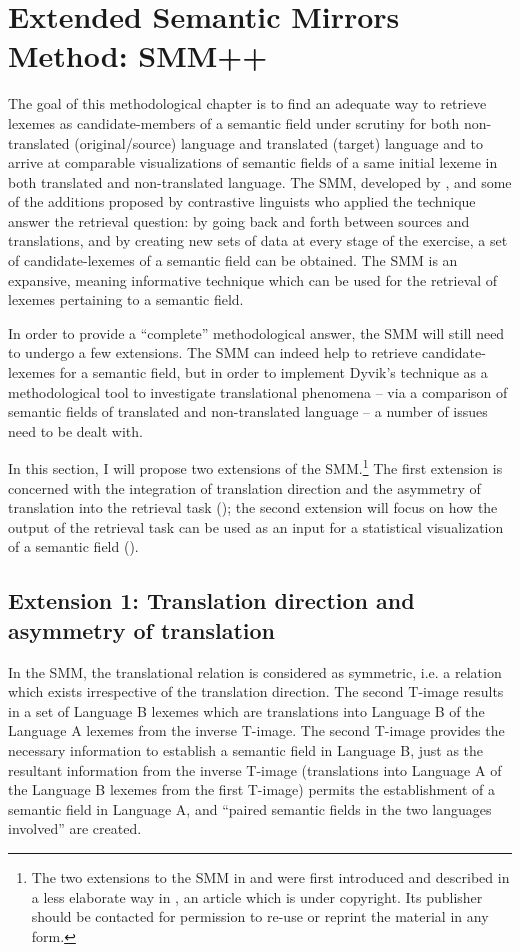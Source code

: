 \section{Extended Semantic Mirrors Method: SMM++}
\label{sec:3.5}
The goal of this methodological chapter is to find an adequate way to retrieve lexemes as candidate-members of a semantic field under scrutiny for both non-translated (original\slash source) language and translated (target) language and to arrive at comparable visualizations of semantic fields of a same initial lexeme in both translated and non-translated language. The SMM, developed by \citet{johansson_translational_1998,langemets_translations_2005}, and some of the additions proposed by contrastive linguists who applied the technique answer the retrieval question: by going back and forth between sources and translations, and by creating new sets of data at every stage of the exercise, a set of candidate-lexemes of a semantic field can be obtained. The SMM is an expansive, meaning informative technique which can be used for the retrieval of lexemes pertaining to a semantic field.

In order to provide a ``complete'' methodological answer, the SMM will still need to undergo a few extensions. The SMM can indeed help to retrieve candi\-date-lexemes for a semantic field, but in order to implement Dyvik’s technique as a methodological tool to investigate translational phenomena – via a comparison of semantic fields of translated and non-translated language – a number of issues need to be dealt with.

In this section, I will propose two extensions of the SMM.\footnote{The two extensions to the SMM in  and  were first introduced and described in a less elaborate way in \citet{VandevoordeEtAl2017}, an article which is under copyright. Its publisher should be contacted for permission to re-use or reprint the material in any form.} The first extension is concerned with the integration of translation direction and the asymmetry of translation into the retrieval task (); the second extension will focus on how the output of the retrieval task can be used as an input for a statistical visualization of a semantic field ().

\subsection{Extension 1: Translation direction and asymmetry of translation}
\label{sec:3.5.1}
In the SMM, the translational relation is considered as symmetric, i.e. a relation which exists irrespective of the translation direction. The second T-image results in a set of Language B lexemes which are translations into Language B of the Language A lexemes from the inverse T-image. The second T-image provides the necessary information to establish a semantic field in Language B, just as the resultant information from the inverse T-image (translations into Language A of the Language B lexemes from the first T-image) permits the establishment of a semantic field in Language A, and “paired semantic fields in the two languages involved” \citep[33]{langemets_translations_2005} are created.

